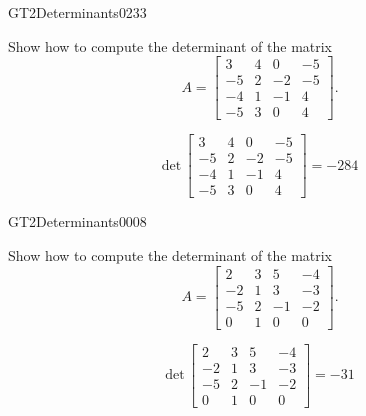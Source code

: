 \begin{exercise}{GT2}{Determinants}{0233} 
\begin{exerciseStatement} 

Show how to compute the determinant of the matrix \[A=\left[\begin{array}{cccc}
3 & 4 & 0 & -5 \\
-5 & 2 & -2 & -5 \\
-4 & 1 & -1 & 4 \\
-5 & 3 & 0 & 4
\end{array}\right].\]

 \end{exerciseStatement}
 \begin{exerciseAnswer} \[\mathrm{det}\,\left[\begin{array}{cccc}
3 & 4 & 0 & -5 \\
-5 & 2 & -2 & -5 \\
-4 & 1 & -1 & 4 \\
-5 & 3 & 0 & 4
\end{array}\right]=-284\] \end{exerciseAnswer}
 \end{exercise}



\begin{exercise}{GT2}{Determinants}{0008} 
\begin{exerciseStatement} 

Show how to compute the determinant of the matrix \[A=\left[\begin{array}{cccc}
2 & 3 & 5 & -4 \\
-2 & 1 & 3 & -3 \\
-5 & 2 & -1 & -2 \\
0 & 1 & 0 & 0
\end{array}\right].\]

 \end{exerciseStatement}
 \begin{exerciseAnswer} \[\mathrm{det}\,\left[\begin{array}{cccc}
2 & 3 & 5 & -4 \\
-2 & 1 & 3 & -3 \\
-5 & 2 & -1 & -2 \\
0 & 1 & 0 & 0
\end{array}\right]=-31\] \end{exerciseAnswer}
 \end{exercise}


\newpage




